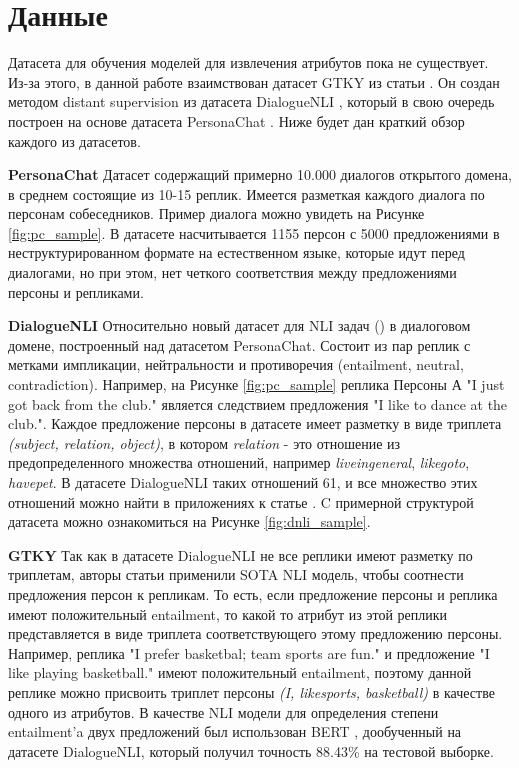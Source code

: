 \section{Данные}
Датасета для обучения моделей для извлечения атрибутов пока не существует. Из-за этого, в данной работе взаимствован датасет GTKY из статьи \cite{gtky}. Он создан методом distant supervision из датасета DialogueNLI \cite{dnli}, который в свою очередь построен на основе датасета PersonaChat \cite{personachat}. Ниже будет дан краткий обзор каждого из датасетов.

\textbf{PersonaChat}    Датасет содержащий примерно 10.000 диалогов открытого домена, в среднем состоящие из 10-15 реплик. Имеется разметкая каждого диалога по персонам собеседников. Пример диалога можно увидеть на Рисунке \ref{fig:pc_sample}. В датасете насчитывается 1155 персон с 5000 предложениями в неструктурированном формате на естественном языке, которые идут перед диалогами, но при этом, нет четкого соответствия между предложениями персоны и репликами.

\textbf{DialogueNLI}    Относительно новый датасет для NLI задач (\cite{nli_survey}) в диалоговом домене, построенный над датасетом PersonaChat. Состоит из пар реплик с метками импликации, нейтральности и противоречия (entailment, neutral, contradiction). Например, на Рисунке \ref{fig:pc_sample} реплика Персоны А "I just got back from the club." является следствием предложения "I like to dance at the club.". Каждое предложение персоны в датасете имеет разметку в виде триплета \textit{(subject, relation, object)}, в котором \textit{relation} - это отношение из предопределенного множества отношений, например \textit{live\textunderscore in\textunderscore general}, \textit{like\textunderscore goto}, \textit{have\textunderscore pet}. В датасете DialogueNLI таких отношений 61, и все множество этих отношений можно найти в приложениях к статье \cite{dnli}. C примерной структурой датасета можно ознакомиться на Рисунке \ref{fig:dnli_sample}.

\textbf{GTKY}   Так как в датасете DialogueNLI не все реплики имеют разметку по триплетам, авторы статьи \cite{gtky} применили SOTA NLI модель, чтобы соотнести предложения персон к репликам. То есть, если предложение персоны и реплика имеют положительный entailment, то какой то атрибут из этой реплики представляется в виде триплета соответствующего этому предложению персоны. Например, реплика "I prefer basketbal; team sports are fun." и предложение "I like playing basketball." имеют положительный entailment, поэтому данной реплике можно присвоить триплет персоны \textit{(I, like\textunderscore sports, basketball)} в качестве одного из атрибутов. В качестве NLI модели для определения степени entailment'a двух предложений был использован BERT \cite{devlin_bert}, дообученный на датасете DialogueNLI, который получил точность 88.43\% на тестовой выборке.

